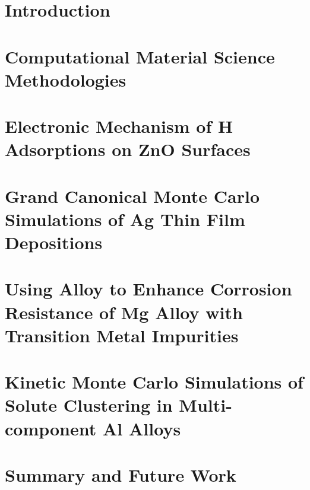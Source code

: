 \documentclass[reqno,12pt,oneside]{report} %
\theoremstyle{plain}
\theoremstyle{definition}
\theoremstyle{remark}
\numberwithin{theorem}{chapter}     %
\begin{document}
\startthechapters

 \chapter{Introduction}
 \label{chap:Intro}
 

 \chapter{Computational Material Science Methodologies}
 \label{chap:Methods}
 

 \chapter{Electronic Mechanism of H Adsorptions on ZnO Surfaces}
 \label{chap:ZnO_H}
 

%  

 \chapter{Grand Canonical Monte Carlo Simulations of Ag Thin Film Depositions}
 \label{chap:Ag/ZnO}
 

 \chapter{Using Alloy to Enhance Corrosion Resistance of Mg Alloy with Transition Metal Impurities}
 \label{chap:Mg_H}
 

 \chapter{Kinetic Monte Carlo Simulations of Solute Clustering in Multi-component Al Alloys}
 \label{chap:Al/Vac}
 

 \chapter{Summary and Future Work}
 \label{chap:Conc}
 
\end{document}
